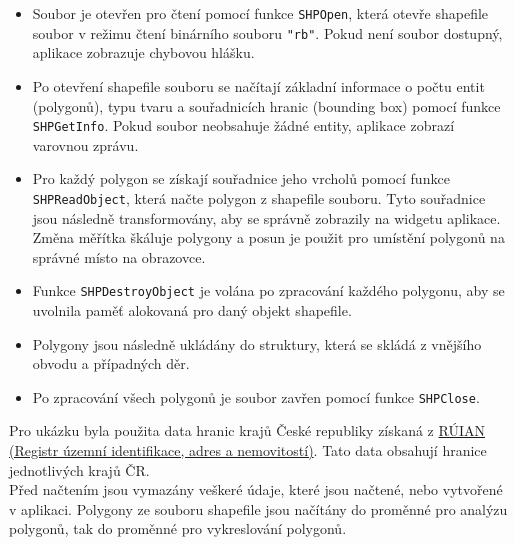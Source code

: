 \begin{itemize}
    \item Soubor je otevřen pro čtení pomocí funkce \texttt{SHPOpen}, která otevře shapefile soubor v režimu čtení binárního souboru \texttt{"rb"}. Pokud není soubor dostupný, aplikace zobrazuje chybovou hlášku.
    \item Po otevření shapefile souboru se načítají základní informace o počtu entit (polygonů), typu tvaru a souřadnicích hranic (bounding box) pomocí funkce \texttt{SHPGetInfo}. Pokud soubor neobsahuje žádné entity, aplikace zobrazí varovnou zprávu.
    \item Pro každý polygon se získají souřadnice jeho vrcholů pomocí funkce \texttt{SHPReadObject}, která načte polygon z shapefile souboru. Tyto souřadnice jsou následně transformovány, aby se správně zobrazily na widgetu aplikace. Změna měřítka škáluje polygony a posun je použit pro umístění polygonů na správné místo na obrazovce.
    \item Funkce \texttt{SHPDestroyObject} je volána po zpracování každého polygonu, aby se uvolnila paměť alokovaná pro daný objekt shapefile.
    \item Polygony jsou následně ukládány do struktury, která se skládá z vnějšího obvodu a případných děr.
    \item Po zpracování všech polygonů je soubor zavřen pomocí funkce \texttt{SHPClose}.
\end{itemize}

Pro ukázku byla použita data hranic krajů České republiky získaná z \href{https://ags.cuzk.gov.cz/arcgis/rest/services/RUIAN/MapServer}{RÚIAN (Registr územní identifikace, adres a nemovitostí)}. Tato data obsahují hranice jednotlivých krajů ČR.\\
Před načtením jsou vymazány veškeré údaje, které jsou načtené, nebo vytvořené v aplikaci. Polygony ze souboru shapefile jsou načítány do proměnné pro analýzu polygonů, tak do proměnné pro vykreslování polygonů.
